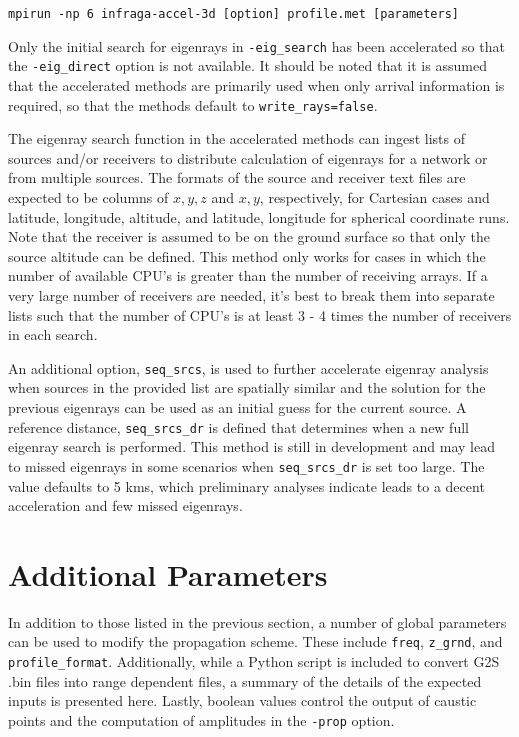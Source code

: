 \documentclass[10pt]{article}
\begin{document}
 \begin{center} 
 \verb#mpirun -np 6 infraga-accel-3d [option] profile.met [parameters]#
 \end{center}
Only the initial search for eigenrays in \verb=-eig_search= has been accelerated so that the \verb=-eig_direct= option is not available.  It should be noted that it is assumed that the accelerated methods are primarily used when only arrival information is required, so that the methods default to \verb#write_rays=false#.
  
The eigenray search function in the accelerated methods can ingest lists of sources and/or receivers to distribute calculation of eigenrays for a network or from multiple sources.  The formats of the source and receiver text files are expected to be columns of \(x, y, z\) and \(x, y\), respectively, for Cartesian cases and latitude, longitude, altitude, and latitude, longitude for spherical coordinate runs.  Note that the receiver is assumed to be on the ground surface so that only the source altitude can be defined.  This method only works for cases in which the number of available CPU's is greater than the number of receiving arrays.  If a very large number of receivers are needed, it's best to break them into separate lists such that the number of CPU's is at least 3 - 4 times the number of receivers in each search.  

An additional option, \verb=seq_srcs=, is used to further accelerate eigenray analysis when sources in the provided list are spatially similar and the solution for the previous eigenrays can be used as an initial guess for the current source.  A reference distance, \verb=seq_srcs_dr= is defined that determines when a new full eigenray search is performed.  This method is still in development and may lead to missed eigenrays in some scenarios when \verb=seq_srcs_dr= is set too large.  The value defaults to 5 kms, which preliminary analyses indicate leads to a decent acceleration and few missed eigenrays.
  
\newpage
\section{Additional Parameters}
\label{Sect:AdditionalParams}

\hspace{0.25in} In addition to those listed in the previous section, a number of global parameters can be used to modify the propagation scheme.  These include \verb#freq#, \verb#z_grnd#, and \verb#profile_format#. Additionally, while a Python script is included to convert G2S .bin files into range dependent files, a summary of the details of the expected inputs is presented here.  Lastly, boolean values control the output of caustic points and the computation of amplitudes in the \verb=-prop= option.
\end{document}
